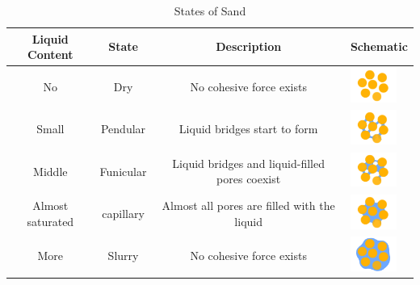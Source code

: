 \documentclass[12pt]{article}
\begin{document}
\begin{table}[H]
    \caption{States of Sand}
    \vspace{10pt}
    \centering
    \begin{tabular}{cccl}
        \hline
        Liquid Content   & State     & Description                                    & Schematic                  \\
        \hline
        No               & Dry       & No cohesive force exists                       & \begin{minipage}{0.5\textwidth}
            \includegraphics[width=1.5cm, height=1.125cm]{s1.png}
        \end{minipage} \\
        Small            & Pendular  & Liquid bridges start to form                   & \begin{minipage}{0.1\textwidth}
            \includegraphics[width=1.5cm, height=1.125cm]{s2.png}
        \end{minipage} \\
        Middle           & Funicular & Liquid bridges and liquid-filled pores coexist & \begin{minipage}{0.1\textwidth}
            \includegraphics[width=1.5cm, height=1.125cm]{s3.png}
        \end{minipage} \\
        Almost saturated & capillary & Almost all pores are filled with the liquid    & \begin{minipage}{0.1\textwidth}
            \includegraphics[width=1.5cm, height=1.125cm]{s4.png}
        \end{minipage} \\
        More             & Slurry    & No cohesive force exists                       & \begin{minipage}{0.1\textwidth}
            \includegraphics[width=1.5cm, height=1.125cm]{s5.png}
        \end{minipage} \\
        \hline
    \end{tabular}
    \label{bs2}
\end{table}
\end{document}
